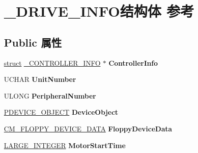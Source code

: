 \hypertarget{struct___d_r_i_v_e___i_n_f_o}{}\section{\+\_\+\+D\+R\+I\+V\+E\+\_\+\+I\+N\+F\+O结构体 参考}
\label{struct___d_r_i_v_e___i_n_f_o}
\subsection*{Public 属性}
\begin{DoxyCompactItemize}
\item 
\mbox{\label{struct___d_r_i_v_e___i_n_f_o_a0fb835298bafb85fb5069aa010068448}} 
\hyperlink{interfacestruct}{struct} \hyperlink{struct___c_o_n_t_r_o_l_l_e_r___i_n_f_o}{\+\_\+\+C\+O\+N\+T\+R\+O\+L\+L\+E\+R\+\_\+\+I\+N\+FO} $\ast$ {\bfseries Controller\+Info}
\item 
\mbox{\label{struct___d_r_i_v_e___i_n_f_o_ad30e545d9528a98835cf19d5a0686c91}} 
U\+C\+H\+AR {\bfseries Unit\+Number}
\item 
\mbox{\label{struct___d_r_i_v_e___i_n_f_o_ab45b677e73d52c33638d30d6dcce839f}} 
U\+L\+O\+NG {\bfseries Peripheral\+Number}
\item 
\mbox{\label{struct___d_r_i_v_e___i_n_f_o_a37dcdd71b9713f2b508d07285719a5cc}} 
\hyperlink{struct___d_e_v_i_c_e___o_b_j_e_c_t}{P\+D\+E\+V\+I\+C\+E\+\_\+\+O\+B\+J\+E\+CT} {\bfseries Device\+Object}
\item 
\mbox{\label{struct___d_r_i_v_e___i_n_f_o_a4c163ee8a62a333ef240fa5900222046}} 
\hyperlink{struct___c_m___f_l_o_p_p_y___d_e_v_i_c_e___d_a_t_a}{C\+M\+\_\+\+F\+L\+O\+P\+P\+Y\+\_\+\+D\+E\+V\+I\+C\+E\+\_\+\+D\+A\+TA} {\bfseries Floppy\+Device\+Data}
\item 
\mbox{\label{struct___d_r_i_v_e___i_n_f_o_a6885016dd429d8aa53e1449dc5ffa09d}} 
\hyperlink{union___l_a_r_g_e___i_n_t_e_g_e_r}{L\+A\+R\+G\+E\+\_\+\+I\+N\+T\+E\+G\+ER} {\bfseries Motor\+Start\+Time}
\item 
\mbox{\label{struct___d_r_i_v_e___i_n_f_o_a9e45a1ef49dc3790e2a5423086594796}} 

\end{DoxyCompactItemize}

